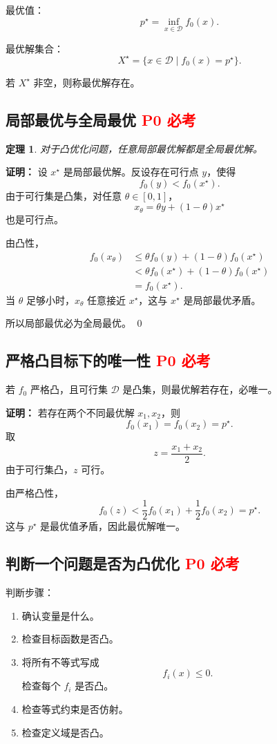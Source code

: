 \documentclass[11pt,a4paper]{ctexart}
\newcommand{\Pzero}{\textcolor{red}{\textbf{P0 必考}}}
\theoremstyle{definition}
\theoremstyle{plain}
\newtheorem{theorem}{定理}[section]
\theoremstyle{remark}
\begin{document}
最优值：
\[
    p^\star=\inf_{x\in\mathcal{D}} f_0(x).
\]

最优解集合：
\[
    X^\star=\{x\in\mathcal{D}\mid f_0(x)=p^\star\}.
\]

若 $X^\star$ 非空，则称最优解存在。

\subsection{局部最优与全局最优 \Pzero}

\begin{theorem}
对于凸优化问题，任意局部最优解都是全局最优解。
\end{theorem}

\textbf{证明：}
设 $x^\star$ 是局部最优解。反设存在可行点 $y$，使得
\[
    f_0(y)<f_0(x^\star).
\]
由于可行集是凸集，对任意 $\theta\in[0,1]$，
\[
    x_\theta=\theta y+(1-\theta)x^\star
\]
也是可行点。

由凸性，
\[
\begin{aligned}
    f_0(x_\theta)
    &\le
    \theta f_0(y)+(1-\theta)f_0(x^\star)\\
    &<
    \theta f_0(x^\star)+(1-\theta)f_0(x^\star)\\
    &=
    f_0(x^\star).
\end{aligned}
\]
当 $\theta$ 足够小时，$x_\theta$ 任意接近 $x^\star$，这与 $x^\star$ 是局部最优矛盾。

所以局部最优必为全局最优。
\qed

\subsection{严格凸目标下的唯一性 \Pzero}

若 $f_0$ 严格凸，且可行集 $\mathcal{D}$ 是凸集，则最优解若存在，必唯一。

\textbf{证明：}
若存在两个不同最优解 $x_1,x_2$，则
\[
    f_0(x_1)=f_0(x_2)=p^\star.
\]
取
\[
    z=\frac{x_1+x_2}{2}.
\]
由于可行集凸，$z$ 可行。

由严格凸性，
\[
    f_0(z)
    <
    \frac12 f_0(x_1)+\frac12 f_0(x_2)
    =
    p^\star.
\]
这与 $p^\star$ 是最优值矛盾，因此最优解唯一。

\subsection{判断一个问题是否为凸优化 \Pzero}

判断步骤：

\begin{enumerate}[label=\arabic*.]
    \item 确认变量是什么。
    \item 检查目标函数是否凸。
    \item 将所有不等式写成
    \[
        f_i(x)\le0.
    \]
    检查每个 $f_i$ 是否凸。
    \item 检查等式约束是否仿射。
    \item 检查定义域是否凸。
\end{enumerate}
\end{document}
